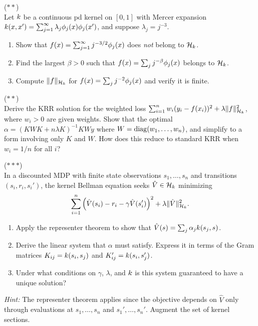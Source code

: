 \documentclass[11pt,a4paper]{article}
\begin{document}
\begin{exercise}
\textnormal{(\(**\))} \\
Let $k$ be a continuous pd kernel on $[0,1]$ with Mercer
expansion $k(x, x') = \sum_{j=1}^\infty \lambda_j
\phi_j(x) \phi_j(x')$, and suppose $\lambda_j = j^{-3}$.
\begin{enumerate}[label=(\alph*)]
    \item Show that $f(x) = \sum_{j=1}^\infty j^{-3/2} \phi_j(x)$
    does \emph{not} belong to $\mathcal{H}_k$.
    \item Find the largest $\beta > 0$ such that
    $f(x) = \sum_j j^{-\beta} \phi_j(x)$ belongs to $\mathcal{H}_k$.
    \item Compute $\|f\|_{\mathcal{H}_k}$ for $f(x) = \sum_j j^{-2}
    \phi_j(x)$ and verify it is finite.
\end{enumerate}
\end{exercise}

\begin{exercise}
\textnormal{(\(**\))} \\
Derive the KRR solution for the weighted loss
$\sum_{i=1}^n w_i (y_i - f(x_i))^2 + \lambda \|f\|_{\mathcal{H}_k}^2$,
where $w_i > 0$ are given weights. Show that the optimal
$\alpha = (K W K + n\lambda K)^{-1} K W y$ where $W = \operatorname{diag}(w_1,
\ldots, w_n)$, and simplify to a form involving only $K$ and $W$.
How does this reduce to standard KRR when $w_i = 1/n$ for all $i$?
\end{exercise}

\begin{exercise}
\textnormal{(\(***\))} \\
In a discounted MDP with finite state observations $s_1, \ldots,
s_n$ and transitions $(s_i, r_i, s_i')$, the kernel Bellman
equation seeks $\hat{V} \in \mathcal{H}_k$ minimizing
\[
\sum_{i=1}^n \left(\hat{V}(s_i) - r_i - \gamma
\hat{V}(s_i')\right)^2 + \lambda \|\hat{V}\|_{\mathcal{H}_k}^2.
\]
\begin{enumerate}[label=(\alph*)]
    \item Apply the representer theorem to show that $\hat{V}(s) =
    \sum_j \alpha_j k(s_j, s)$.
    \item Derive the linear system that $\alpha$ must satisfy.
    Express it in terms of the Gram matrices $K_{ij} = k(s_i, s_j)$
    and $K'_{ij} = k(s_i, s_j')$.
    \item Under what conditions on $\gamma$, $\lambda$, and $k$
    is this system guaranteed to have a unique solution?
\end{enumerate}

\textit{Hint:} The representer theorem applies since the objective
depends on $\hat{V}$ only through evaluations at $s_1, \ldots, s_n$
and $s_1', \ldots, s_n'$. Augment the set of kernel sections.
\end{exercise}
\end{document}
